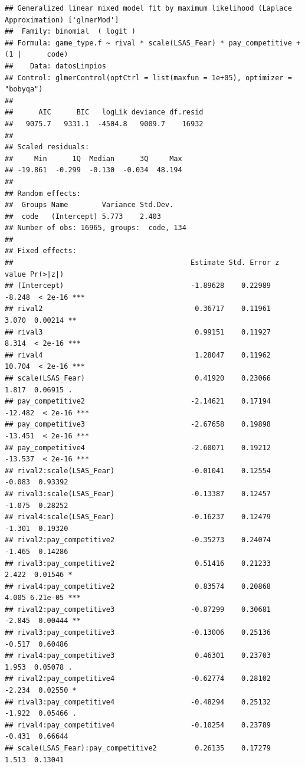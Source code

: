 \documentclass[
]{article}
\begin{document}
\begin{verbatim}
## Generalized linear mixed model fit by maximum likelihood (Laplace Approximation) ['glmerMod']
##  Family: binomial  ( logit )
## Formula: game_type.f ~ rival * scale(LSAS_Fear) * pay_competitive + (1 |      code)
##    Data: datosLimpios
## Control: glmerControl(optCtrl = list(maxfun = 1e+05), optimizer = "bobyqa")
## 
##      AIC      BIC   logLik deviance df.resid 
##   9075.7   9331.1  -4504.8   9009.7    16932 
## 
## Scaled residuals: 
##     Min      1Q  Median      3Q     Max 
## -19.861  -0.299  -0.130  -0.034  48.194 
## 
## Random effects:
##  Groups Name        Variance Std.Dev.
##  code   (Intercept) 5.773    2.403   
## Number of obs: 16965, groups:  code, 134
## 
## Fixed effects:
##                                          Estimate Std. Error z value Pr(>|z|)    
## (Intercept)                              -1.89628    0.22989  -8.248  < 2e-16 ***
## rival2                                    0.36717    0.11961   3.070  0.00214 ** 
## rival3                                    0.99151    0.11927   8.314  < 2e-16 ***
## rival4                                    1.28047    0.11962  10.704  < 2e-16 ***
## scale(LSAS_Fear)                          0.41920    0.23066   1.817  0.06915 .  
## pay_competitive2                         -2.14621    0.17194 -12.482  < 2e-16 ***
## pay_competitive3                         -2.67658    0.19898 -13.451  < 2e-16 ***
## pay_competitive4                         -2.60071    0.19212 -13.537  < 2e-16 ***
## rival2:scale(LSAS_Fear)                  -0.01041    0.12554  -0.083  0.93392    
## rival3:scale(LSAS_Fear)                  -0.13387    0.12457  -1.075  0.28252    
## rival4:scale(LSAS_Fear)                  -0.16237    0.12479  -1.301  0.19320    
## rival2:pay_competitive2                  -0.35273    0.24074  -1.465  0.14286    
## rival3:pay_competitive2                   0.51416    0.21233   2.422  0.01546 *  
## rival4:pay_competitive2                   0.83574    0.20868   4.005 6.21e-05 ***
## rival2:pay_competitive3                  -0.87299    0.30681  -2.845  0.00444 ** 
## rival3:pay_competitive3                  -0.13006    0.25136  -0.517  0.60486    
## rival4:pay_competitive3                   0.46301    0.23703   1.953  0.05078 .  
## rival2:pay_competitive4                  -0.62774    0.28102  -2.234  0.02550 *  
## rival3:pay_competitive4                  -0.48294    0.25132  -1.922  0.05466 .  
## rival4:pay_competitive4                  -0.10254    0.23789  -0.431  0.66644    
## scale(LSAS_Fear):pay_competitive2         0.26135    0.17279   1.513  0.13041    

\end{verbatim}
\end{document}
